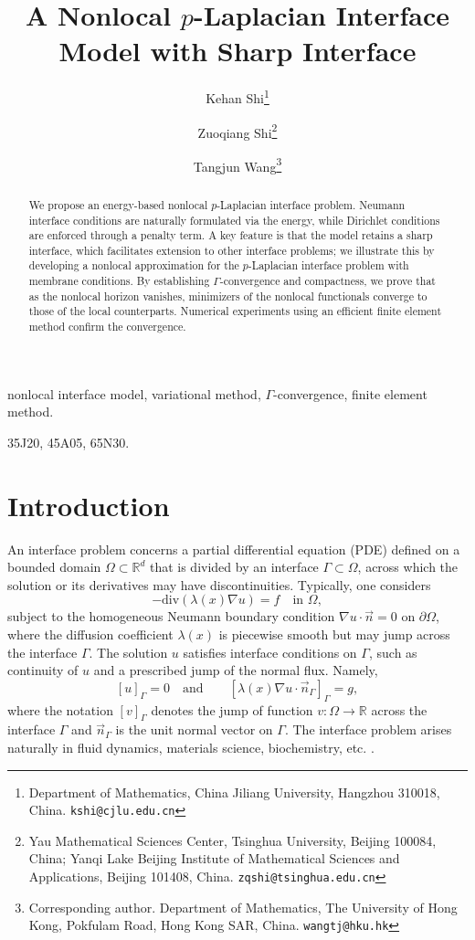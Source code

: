 \documentclass{article}
\title{A Nonlocal $p$-Laplacian Interface Model with Sharp Interface}
\author{
Kehan Shi\thanks{{Department of Mathematics, China Jiliang University, Hangzhou 310018, China.} \texttt{kshi@cjlu.edu.cn}}%
\and
Zuoqiang Shi\thanks{{Yau Mathematical Sciences Center, Tsinghua University, Beijing 100084, China;}  {Yanqi Lake Beijing Institute of Mathematical Sciences and Applications, Beijing 101408, China.} \texttt{zqshi@tsinghua.edu.cn}}%
\and
Tangjun Wang\thanks{{Corresponding author. Department of Mathematics, The University of Hong Kong, Pokfulam Road, Hong Kong SAR, China.} \texttt{wangtj@hku.hk}}%
}
\date{}
\newcommand{\R}{\mathbb{R}}
\theoremstyle{definition}
\begin{document}

\maketitle


\begin{abstract}
We propose an energy-based nonlocal $p$-Laplacian interface problem. Neumann interface conditions are naturally formulated via the energy, while Dirichlet conditions are enforced through a penalty term. A key feature is that the model retains a sharp interface, which facilitates extension to other interface problems; we illustrate this by developing a nonlocal approximation for the $p$-Laplacian interface problem with membrane conditions. By establishing $\Gamma$-convergence and compactness, we prove that as the nonlocal horizon vanishes, minimizers of the nonlocal functionals converge to those of the local counterparts. Numerical experiments using an efficient finite element method confirm the convergence.
\end{abstract}

\medskip

 nonlocal interface model, variational method, $\Gamma$-convergence, finite element method.

\medskip

 35J20, 45A05, 65N30.

\section{Introduction}
An interface problem concerns a partial differential equation (PDE) defined on a bounded domain $\Omega\subset \R^d$ that is divided by an interface $\Gamma\subset \Omega$, across which the solution or its derivatives may have discontinuities. Typically, one considers
\begin{equation}\label{eq:1.1}
  -\mbox{div} (\lambda(x) \nabla u) = f \quad \text{in } \Omega,
\end{equation}
subject to the homogeneous Neumann boundary condition $\nabla u\cdot\vec{n}=0$ on $\partial \Omega$, where the diffusion coefficient $\lambda(x)$ is piecewise smooth but may jump across the interface $\Gamma$. The solution $u$ satisfies interface conditions on $\Gamma$, such as continuity of $u$ and a prescribed jump of the normal flux. Namely,
\begin{equation}\label{eq:1.2}
[u]_\Gamma = 0 \quad \mbox{and}\quad
\quad \left[\lambda(x)\nabla u\cdot\vec{n}_\Gamma \right]_\Gamma = g,
\end{equation}
where the notation $[v]_\Gamma$ denotes the jump of function $v:\Omega\rightarrow\R$ across the interface $\Gamma$
and $\vec{n}_\Gamma$ is the unit normal vector on $\Gamma$.
The interface problem arises naturally in fluid dynamics, materials science, biochemistry, etc. \cite{anderson1998diffuse,li2006immersed,alali2015peridynamics}.
\end{document}
